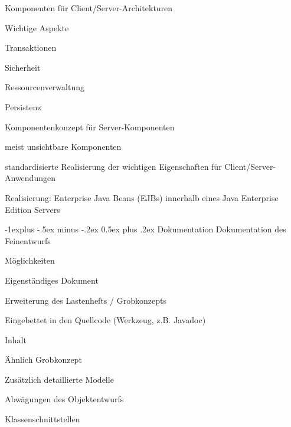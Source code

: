 \documentclass[a4paper]{article}
\makeatletter
\renewcommand{\subsection}{\@startsection{subsection}{2}{0mm}%
                                {-1explus -.5ex minus -.2ex}%
                                {0.5ex plus .2ex}%
                                {\normalfont\normalsize\bfseries}}
\makeatother
\begin{document}
\begin{multicols}{3}
  Komponenten für Client/Server-Architekturen
  \begin{itemize*}
    \item Wichtige Aspekte
    \begin{itemize*}
      \item Transaktionen
      \item Sicherheit
      \item Ressourcenverwaltung
      \item Persistenz
    \end{itemize*}
    \item Komponentenkonzept für Server-Komponenten
    \begin{itemize*}
      \item meist unsichtbare Komponenten
      \item standardisierte Realisierung der wichtigen Eigenschaften für Client/Server-Anwendungen
      \item Realisierung: Enterprise Java Beans (EJBs) innerhalb eines Java Enterprise Edition Servers
    \end{itemize*}
  \end{itemize*}

  \subsection{Dokumentation}
  Dokumentation des Feinentwurfs
  \begin{itemize*}
    \item Möglichkeiten
    \begin{itemize*}
      \item Eigenständiges Dokument
      \item Erweiterung des Lastenhefts / Grobkonzepts
      \item Eingebettet in den Quellcode (Werkzeug, z.B. Javadoc)
    \end{itemize*}
    \item Inhalt
    \begin{itemize*}
      \item Ähnlich Grobkonzept
      \item Zusätzlich detaillierte Modelle
      \item Abwägungen des Objektentwurfs
      \item Klassenschnittstellen
    \end{itemize*}
  \end{itemize*}

  \newpage

\end{multicols}
\end{document}
